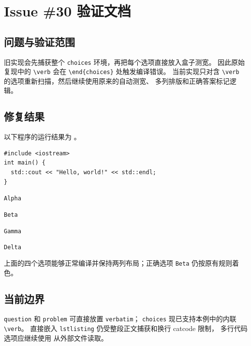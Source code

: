 \documentclass{exam-zh}
\begin{document}
\chapter*{Issue \#30 验证文档}

\section*{问题与验证范围}

旧实现会先捕获整个 \texttt{choices} 环境，再把每个选项直接放入盒子测宽。
因此原始复现中的 \verb|\verb| 会在 \verb|\end{choices}| 处触发编译错误。
当前实现只对含 \verb|\verb| 的选项重新扫描，然后继续使用原来的自动测宽、
多列排版和正确答案标记逻辑。

\section*{修复结果}

\begin{question}
  以下程序的运行结果为 \paren。

  \begin{verbatim}
#include <iostream>
int main() {
  std::cout << "Hello, world!" << std::endl;
}
  \end{verbatim}

  \begin{choices}[columns=2,show-answer=true]
    \item \verb+Alpha+
    \item* \verb-Beta-
    \item \verb,Gamma,
    \item \verb|Delta|
  \end{choices}
\end{question}

上面的四个选项能够正常编译并保持两列布局；正确选项 \verb|Beta| 仍按原有规则着色。

\section*{当前边界}

\verb|question| 和 \verb|problem| 可直接放置 \verb|verbatim|；
\verb|choices| 现已支持本例中的内联 \verb|\verb|。
直接嵌入 \verb|lstlisting| 仍受整段正文捕获和换行 catcode 限制，
多行代码选项应继续使用 \verb|| 从外部文件读取。
\end{document}
